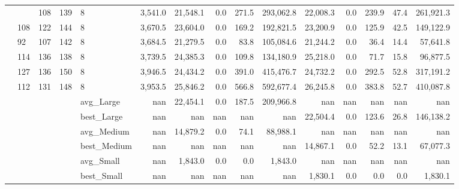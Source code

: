 \begin{table}[htb]
\begin{tabular}{lllllrrrrrrrrrr}
 &  & 108 & 139 & 8 & 3,541.0 & 21,548.1 & 0.0 & 271.5 & 293,062.8 & 22,008.3 & 0.0 & 239.9 & 47.4 & 261,921.3 \\
 & 108 & 122 & 144 & 8 & 3,670.5 & 23,604.0 & 0.0 & 169.2 & 192,821.5 & 23,200.9 & 0.0 & 125.9 & 42.5 & 149,122.9 \\
 & 92 & 107 & 142 & 8 & 3,684.5 & 21,279.5 & 0.0 & 83.8 & 105,084.6 & 21,244.2 & 0.0 & 36.4 & 14.4 & 57,641.8 \\
 & 114 & 136 & 138 & 8 & 3,739.5 & 24,385.3 & 0.0 & 109.8 & 134,180.9 & 25,218.0 & 0.0 & 71.7 & 15.8 & 96,877.5 \\
 & 127 & 136 & 150 & 8 & 3,946.5 & 24,434.2 & 0.0 & 391.0 & 415,476.7 & 24,732.2 & 0.0 & 292.5 & 52.8 & 317,191.2 \\
 & 112 & 131 & 148 & 8 & 3,953.5 & 25,846.2 & 0.0 & 566.8 & 592,677.4 & 26,245.8 & 0.0 & 383.8 & 52.7 & 410,087.8 \\
\multirow[c]{6}{*}{} & \multirow[c]{6}{*}{} & \multirow[c]{6}{*}{} & \multirow[c]{6}{*}{} & avg_Large & nan & 22,454.1 & 0.0 & 187.5 & 209,966.8 & nan & nan & nan & nan & nan \\
 &  &  &  & best_Large & nan & nan & nan & nan & nan & 22,504.4 & 0.0 & 123.6 & 26.8 & 146,138.2 \\
 &  &  &  & avg_Medium & nan & 14,879.2 & 0.0 & 74.1 & 88,988.1 & nan & nan & nan & nan & nan \\
 &  &  &  & best_Medium & nan & nan & nan & nan & nan & 14,867.1 & 0.0 & 52.2 & 13.1 & 67,077.3 \\
 &  &  &  & avg_Small & nan & 1,843.0 & 0.0 & 0.0 & 1,843.0 & nan & nan & nan & nan & nan \\
 &  &  &  & best_Small & nan & nan & nan & nan & nan & 1,830.1 & 0.0 & 0.0 & 0.0 & 1,830.1 \\
\bottomrule
\end{tabular}
\end{table}
